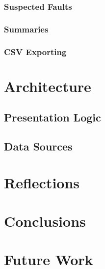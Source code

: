 \documentclass{article}
\begin{document}
\subsubsection{Suspected Faults}
\subsubsection{Summaries}
\subsubsection{CSV Exporting}

\section{Architecture}
\subsection{Presentation Logic}
\subsection{Data Sources}
\section{Reflections}
\section{Conclusions}

\section{Future Work}



\end{document}
